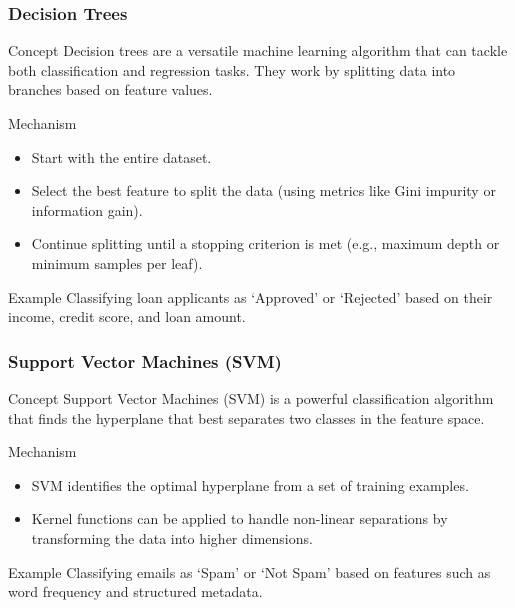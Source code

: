 \documentclass[aspectratio=169]{beamer}
\begin{document}
\begin{frame}[fragile]
    \frametitle{Decision Trees}
    \begin{block}{Concept}
        Decision trees are a versatile machine learning algorithm that can tackle both classification and regression tasks. 
        They work by splitting data into branches based on feature values.
    \end{block}

    \begin{block}{Mechanism}
        \begin{itemize}
            \item Start with the entire dataset.
            \item Select the best feature to split the data (using metrics like Gini impurity or information gain).
            \item Continue splitting until a stopping criterion is met (e.g., maximum depth or minimum samples per leaf).
        \end{itemize}
    \end{block}
    
    \begin{block}{Example}
        Classifying loan applicants as ‘Approved’ or ‘Rejected’ based on their income, credit score, and loan amount.
    \end{block}
\end{frame}

\begin{frame}[fragile]
    \frametitle{Support Vector Machines (SVM)}
    \begin{block}{Concept}
        Support Vector Machines (SVM) is a powerful classification algorithm that finds the hyperplane that best separates two classes in the feature space.
    \end{block}

    \begin{block}{Mechanism}
        \begin{itemize}
            \item SVM identifies the optimal hyperplane from a set of training examples.
            \item Kernel functions can be applied to handle non-linear separations by transforming the data into higher dimensions.
        \end{itemize}
    \end{block}
    
    \begin{block}{Example}
        Classifying emails as ‘Spam’ or ‘Not Spam’ based on features such as word frequency and structured metadata.
    \end{block}
\end{frame}
\end{document}
